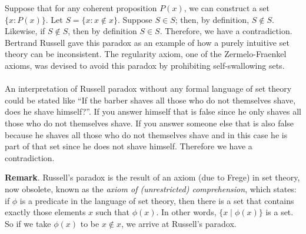 \documentclass{article}
\begin{document}
Suppose that for any coherent proposition $P(x)$, we can construct a set $\{x: P(x)\}$.
\medskip
Let $S = \{x: x \not\in x\}$.  Suppose $S \in S$; then, by definition, $S \not\in S$.  Likewise, if $S \not\in S$, then by definition $S \in S$.  Therefore, we have a contradiction.
\medskip
Bertrand Russell gave this paradox as an example of how a purely intuitive set theory can be inconsistent.  The regularity axiom, one of the Zermelo-Fraenkel axioms, was devised to avoid this paradox by prohibiting self-swallowing sets.\\\\
An interpretation of Russell paradox without any formal language of set theory could be stated like ``If the barber shaves all those who do not themselves shave, does he shave himself?''.  If you answer himself that is false since he only shaves all those who do not themselves shave.  If you answer someone else that is also false because he shaves all those who do not themselves shave and in this case he is part of that set since he does not shave himself.  Therefore we have a contradiction.

\textbf{Remark}.  Russell's paradox is the result of an axiom (due to Frege) in set theory, now obsolete, known as the \emph{axiom of (unrestricted) comprehension}, which states: if $\phi$ is a predicate in the language of set theory, then there is a set that contains exactly those elements $x$ such that $\phi(x)$.  In other words, $\lbrace x\mid \phi(x)\rbrace$ is a set.  So if we take $\phi(x)$ to be $x\notin x$, we arrive at Russell's paradox.
\end{document}
